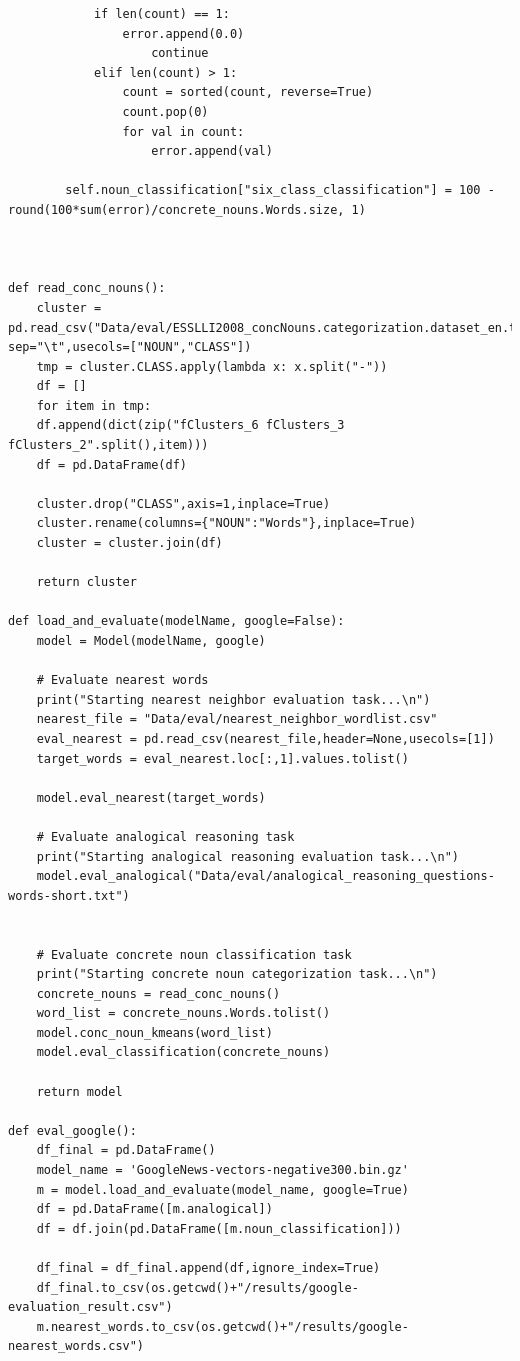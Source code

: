 \documentclass[12pt]{report}
\begin{document}
\begin{lstlisting}
			if len(count) == 1:
				error.append(0.0)
					continue
			elif len(count) > 1:
				count = sorted(count, reverse=True)
				count.pop(0)
				for val in count:
					error.append(val)

		self.noun_classification["six_class_classification"] = 100 - round(100*sum(error)/concrete_nouns.Words.size, 1)



def read_conc_nouns():
	cluster = pd.read_csv("Data/eval/ESSLLI2008_concNouns.categorization.dataset_en.txt", sep="\t",usecols=["NOUN","CLASS"])
	tmp = cluster.CLASS.apply(lambda x: x.split("-"))
	df = []
	for item in tmp:
	df.append(dict(zip("fClusters_6 fClusters_3 fClusters_2".split(),item)))
	df = pd.DataFrame(df)

	cluster.drop("CLASS",axis=1,inplace=True)
	cluster.rename(columns={"NOUN":"Words"},inplace=True)
	cluster = cluster.join(df)

	return cluster

def load_and_evaluate(modelName, google=False): 
	model = Model(modelName, google)

	# Evaluate nearest words
	print("Starting nearest neighbor evaluation task...\n")
	nearest_file = "Data/eval/nearest_neighbor_wordlist.csv"
	eval_nearest = pd.read_csv(nearest_file,header=None,usecols=[1])
	target_words = eval_nearest.loc[:,1].values.tolist()

	model.eval_nearest(target_words)

	# Evaluate analogical reasoning task
	print("Starting analogical reasoning evaluation task...\n")
	model.eval_analogical("Data/eval/analogical_reasoning_questions-words-short.txt")


	# Evaluate concrete noun classification task
	print("Starting concrete noun categorization task...\n")
	concrete_nouns = read_conc_nouns()
	word_list = concrete_nouns.Words.tolist()
	model.conc_noun_kmeans(word_list)
	model.eval_classification(concrete_nouns)

	return model
	
def eval_google():
	df_final = pd.DataFrame()
	model_name = 'GoogleNews-vectors-negative300.bin.gz'
	m = model.load_and_evaluate(model_name, google=True) 
	df = pd.DataFrame([m.analogical])
	df = df.join(pd.DataFrame([m.noun_classification]))

	df_final = df_final.append(df,ignore_index=True)
	df_final.to_csv(os.getcwd()+"/results/google-evaluation_result.csv")
	m.nearest_words.to_csv(os.getcwd()+"/results/google-nearest_words.csv")
	

\end{lstlisting}
\end{document}
